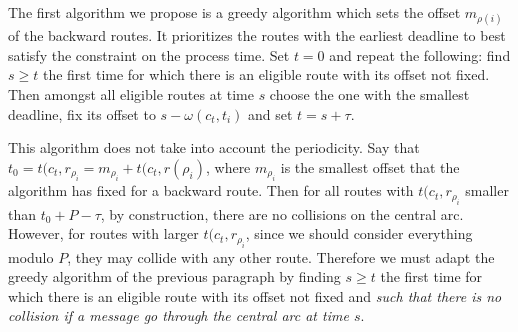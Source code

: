 \documentclass[10pt, conference, letterpaper]{IEEEtran}
\begin{document}
    The first algorithm we propose is a greedy algorithm which sets the offset $m_{\rho(i)}$ of the 
    backward routes. It prioritizes the routes with the earliest deadline to best satisfy the
    constraint on the process time.
    Set $t=0$ and repeat the following: find $s \geq t$ the first time for which there is an eligible route with its offset not fixed. Then amongst all eligible routes at time $s$ choose the one with the smallest deadline, fix its offset to $s - \omega(c_t,t_i) $ and set $t = s + \tau$.
    
    This algorithm does not take into account the periodicity. Say that $t_0 = t(c_t,r_{\rho_i} = m_{\rho_i} + t(c_t,r(\rho_i)$, where $m_{\rho_i}$ is the smallest offset that the algorithm has fixed
    for a backward route. Then for all routes with $t(c_t,r_{\rho_i}$ smaller than $t_0 + P - \tau$,
    by construction, there are no collisions on the central arc.
    However, for routes with larger $t(c_t,r_{\rho_i}$, since we  should consider everything modulo $P$, 
    they may collide with any other route. Therefore we must adapt the greedy algorithm of the previous paragraph by finding $s \geq t$ the first time for which there is an eligible route with its offset not fixed and \emph{such that there is no collision if a message go through the central arc at time $s$}. 
    
\end{document}
